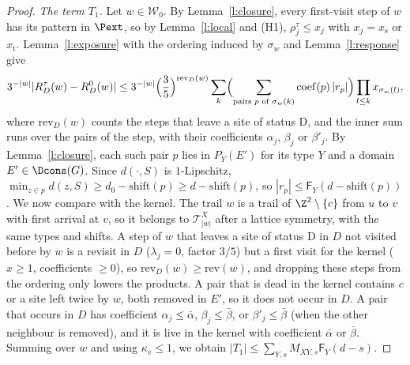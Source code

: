 \begin{proof}
\emph{The term $T_1$.} Let $w \in \mathcal W_0$. By Lemma~\ref{l:closure}, every first-visit step of $w$ has its pattern in $\Pext$, so by Lemma~\ref{l:local} and (H1), $\rho^\tau_j \le x_j$ with $x_j = x_{\mathrm s}$ or $x_{\mathrm t}$. Lemma~\ref{l:exposure} with the ordering induced by $\sigma_w$ and Lemma~\ref{l:response} give
\begin{equation*}
3^{-|w|} |R^\tau_D(w) - R^0_D(w)| \le 3^{-|w|} \Bigl( \frac35 \Bigr)^{\mathrm{rev}_D(w)} \sum_k \Bigl( \sum_{\text{pairs } p \text{ of } \sigma_w(k)} \mathrm{coef}(p) \, |r_p| \Bigr) \prod_{l \le k} x_{\sigma_w(l)},
\end{equation*}
where $\mathrm{rev}_D(w)$ counts the steps that leave a site of status $\mathrm D$, and the inner sum runs over the pairs of the step, with their coefficients $\alpha_j$, $\beta_j$ or $\beta'_j$. By Lemma~\ref{l:closure}, each such pair $p$ lies in $P_Y(E')$ for its type $Y$ and a domain $E' \in \Dcons(G)$. Since $d(\cdot, S)$ is $1$-Lipschitz, $\min_{z \in p} d(z, S) \ge d_0 - \mathrm{shift}(p) \ge d - \mathrm{shift}(p)$, so $|r_p| \le \mathsf F_Y(d - \mathrm{shift}(p))$. We now compare with the kernel. The trail $w$ is a trail of $\Z^2 \setminus \{c\}$ from $u$ to $v$ with first arrival at $v$, so it belongs to $\mathcal T^X_{|w|}$ after a lattice symmetry, with the same types and shifts. A step of $w$ that leaves a site of status $\mathrm D$ in $D$ not visited before by $w$ is a revisit in $D$ ($\lambda_j = 0$, factor $3/5$) but a first visit for the kernel ($x \ge 1$, coefficients $\ge 0$), so $\mathrm{rev}_D(w) \ge \mathrm{rev}(w)$, and dropping these steps from the ordering only lowers the products. A pair that is dead in the kernel contains $c$ or a site left twice by $w$, both removed in $E'$, so it does not occur in $D$. A pair that occurs in $D$ has coefficient $\alpha_j \le \bar\alpha$, $\beta_j \le \bar\beta$, or $\beta'_j \le \bar\beta$ (when the other neighbour is removed), and it is live in the kernel with coefficient $\bar\alpha$ or $\bar\beta$. Summing over $w$ and using $\kappa_v \le 1$, we obtain $|T_1| \le \sum_{Y, s} M_{XY, s} \mathsf F_Y(d - s)$.


\end{proof}
